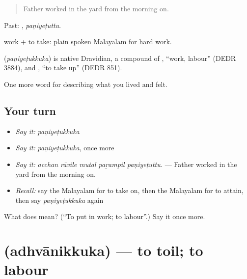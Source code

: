 \begin{quote}
Father worked in the yard from the morning on.
\end{quote}

Past: , \emph{paṇiyeṭuttu}.

 work +  to take: plain spoken Malayalam for hard work.

\begin{cousinweb}
\textbf{} (\emph{paṇiyeṭukkuka}) is native Dravidian, a compound of , \textquotedblleft{}work, labour\textquotedblright{} (DEDR 3884), and , \textquotedblleft{}to take up\textquotedblright{} (DEDR 851).
\end{cousinweb}

\begin{grammarlens}[title={What you've built}]
One more word for describing what you lived and felt.
\end{grammarlens}

\subsection*{Your turn}
\begin{itemize}
\raggedright
  \item \emph{Say it:} \emph{paṇiyeṭukkuka}
  \item \emph{Say it:} \emph{paṇiyeṭukkuka}, once more
  \item \emph{Say it:} \emph{acchan rāvile mutal paṟampil paṇiyeṭuttu.} — Father worked in the yard from the morning on.
  \item \emph{Recall:} say the Malayalam for to take on, then the Malayalam for to attain, then say \emph{paṇiyeṭukkuka} again
\end{itemize}

\begin{tcolorbox}[breakable,colback=teal!4,colframe=teal!35!black,title={Before you move on}]
What does  mean? (\textquotedblleft{}To put in work; to labour\textquotedblright{}.) Say it once more.
\end{tcolorbox}
\section[\texorpdfstring{\ml{അധ്വാനിക്കുക} (adhvānikkuka)}{അധ്വാനിക്കുക (adhvānikkuka)}]{ (adhvānikkuka) — to toil; to labour}

\label{lesson:ML-C551-adhvanikkuka}



